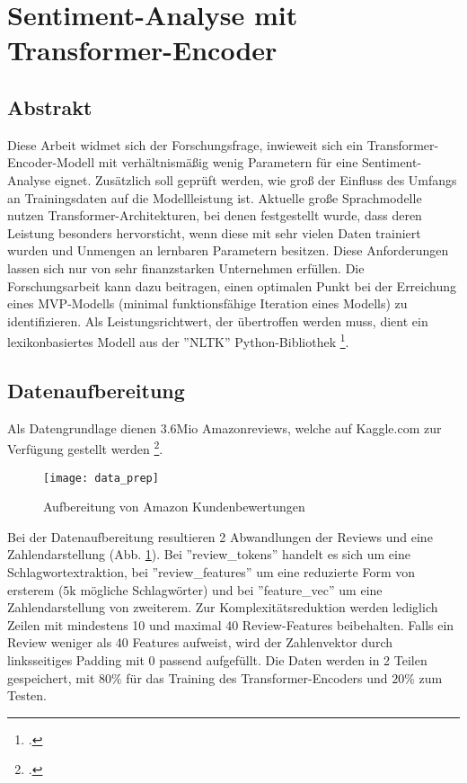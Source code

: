 \newpage
\section*{Sentiment-Analyse mit Transformer-Encoder}

\subsection*{Abstrakt}\label{sec:patent_info_gehalt}

Diese Arbeit widmet sich der Forschungsfrage, inwieweit sich ein Transformer-Encoder-Modell mit verhältnismäßig wenig Parametern für eine Sentiment-Analyse eignet. Zusätzlich soll geprüft werden, wie groß der Einfluss des Umfangs an Trainingsdaten auf die Modellleistung ist. Aktuelle große Sprachmodelle nutzen Transformer-Architekturen, bei denen festgestellt wurde, dass deren Leistung besonders hervorsticht, wenn diese mit sehr vielen Daten trainiert wurden und Unmengen an lernbaren Parametern besitzen. Diese Anforderungen lassen sich nur von sehr finanzstarken Unternehmen erfüllen. Die Forschungsarbeit kann dazu beitragen, einen optimalen Punkt bei der Erreichung eines MVP-Modells (minimal funktionsfähige Iteration eines Modells) zu identifizieren. Als Leistungsrichtwert, der übertroffen werden muss, dient ein lexikonbasiertes Modell aus der ''NLTK'' Python-Bibliothek \footcite{website:VADER}.


\subsection*{Datenaufbereitung}\label{sec:ipc}

Als Datengrundlage dienen $3.6 \text{Mio}$ Amazonreviews, welche auf Kaggle.com zur Verfügung gestellt werden \footcite{website:AmazonReviews}.

\begin{figure}[H]
	\caption{Aufbereitung von Amazon Kundenbewertungen}
	\texttt{[image: data\_prep]}
	\label{fig:data_prep}
	\raggedright
	\vspace{-1.0em}
\end{figure} 

Bei der Datenaufbereitung resultieren 2 Abwandlungen der Reviews und eine Zahlendarstellung (Abb. \ref{fig:data_prep}).
Bei ''review\_tokens'' handelt es sich um eine Schlagwortextraktion, bei ''review\_features'' um eine reduzierte Form von ersterem ($5\text{k}$ mögliche Schlagwörter) und bei ''feature\_vec'' um eine Zahlendarstellung von zweiterem. Zur Komplexitätsreduktion werden lediglich Zeilen mit mindestens 10 und maximal 40 Review-Features beibehalten. Falls ein Review weniger als 40 Features aufweist, wird der Zahlenvektor durch linksseitiges Padding mit $0$ passend aufgefüllt. Die Daten werden in 2 Teilen gespeichert, mit $80\%$ für das Training des Transformer-Encoders und $20\%$ zum Testen.


